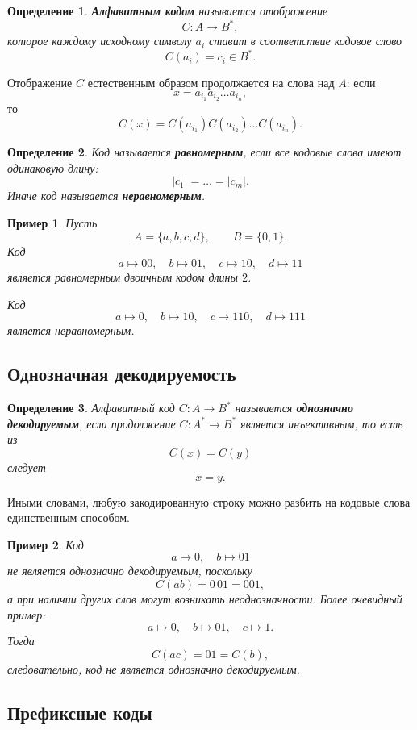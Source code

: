 \documentclass[12pt,a4paper]{article}
\newtheorem{definition}{Определение}[section]
\newtheorem{example}{Пример}[section]
\begin{document}
\begin{definition}
\textbf{Алфавитным кодом} называется отображение
\[
    C : A \to B^*,
\]
которое каждому исходному символу $a_i$ ставит в соответствие кодовое слово
\[
    C(a_i) = c_i \in B^*.
\]
\end{definition}

Отображение $C$ естественным образом продолжается на слова над $A$:
если
\[
    x = a_{i_1}a_{i_2}\dots a_{i_n},
\]
то
\[
    C(x) = C(a_{i_1})C(a_{i_2})\dots C(a_{i_n}).
\]

\begin{definition}
Код называется \textbf{равномерным}, если все кодовые слова имеют одинаковую длину:
\[
    |c_1|=\dots=|c_m|.
\]
Иначе код называется \textbf{неравномерным}.
\end{definition}

\begin{example}
Пусть
\[
    A=\{a,b,c,d\}, \qquad B=\{0,1\}.
\]
Код
\[
    a\mapsto 00,\quad b\mapsto 01,\quad c\mapsto 10,\quad d\mapsto 11
\]
является равномерным двоичным кодом длины $2$.

Код
\[
    a\mapsto 0,\quad b\mapsto 10,\quad c\mapsto 110,\quad d\mapsto 111
\]
является неравномерным.
\end{example}

\subsection{Однозначная декодируемость}

\begin{definition}
Алфавитный код $C:A\to B^*$ называется \textbf{однозначно декодируемым}, если продолжение $C:A^*\to B^*$ является инъективным, то есть из
\[
    C(x)=C(y)
\]
следует
\[
    x=y.
\]
\end{definition}

Иными словами, любую закодированную строку можно разбить на кодовые слова единственным способом.

\begin{example}
Код
\[
    a\mapsto 0,\quad b\mapsto 01
\]
не является однозначно декодируемым, поскольку
\[
    C(ab)=0\,01=001,
\]
а при наличии других слов могут возникать неоднозначности. Более очевидный пример:
\[
    a\mapsto 0,\quad b\mapsto 01,\quad c\mapsto 1.
\]
Тогда
\[
    C(ac)=01=C(b),
\]
следовательно, код не является однозначно декодируемым.
\end{example}

\subsection{Префиксные коды}
\end{document}
